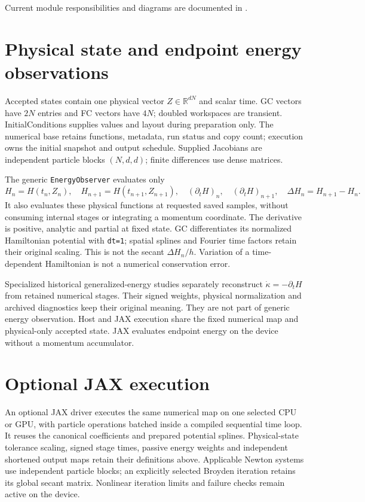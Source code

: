 \documentclass[11pt,a4paper]{article}
\begin{document}
Current module responsibilities and diagrams are documented in
.

\section{Physical state and endpoint energy observations}
Accepted states contain one physical vector $Z\in\mathbb{R}^{dN}$ and scalar time.
GC vectors have $2N$ entries and FC vectors have $4N$; doubled workspaces are
transient. InitialConditions supplies values and layout during preparation only.
The numerical base retains functions, metadata, run status and copy count;
execution owns the initial snapshot and output schedule. Supplied Jacobians are
independent particle blocks $(N,d,d)$; finite differences use dense matrices.

The generic \texttt{EnergyObserver} evaluates only
\[
 H_n=H(t_n,Z_n),\quad H_{n+1}=H(t_{n+1},Z_{n+1}),\quad
 (\partial_tH)_n,\quad (\partial_tH)_{n+1},\quad
 \Delta H_n=H_{n+1}-H_n.
\]
It also evaluates these physical functions at requested saved samples, without
consuming internal stages or integrating a momentum coordinate. The derivative
is positive, analytic and partial at fixed state. GC differentiates its normalized
Hamiltonian potential with \texttt{dt=1}; spatial splines and Fourier time factors
retain their original scaling. This is not the secant $\Delta H_n/h$.
Variation of a time-dependent Hamiltonian is not a numerical conservation error.

Specialized historical generalized-energy studies separately reconstruct
$\dot\kappa=-\partial_tH$ from retained numerical stages. Their signed weights,
physical normalization and archived diagnostics keep their original meaning.
They are not part of generic energy observation. Host and JAX execution share
the fixed numerical map and physical-only accepted state. JAX evaluates endpoint
energy on the device without a momentum accumulator.

\section{Optional JAX execution}

An optional JAX driver executes the same numerical map on one selected CPU
or GPU, with particle operations batched inside a compiled sequential time
loop. It reuses the canonical coefficients and prepared potential splines.
Physical-state tolerance scaling, signed stage times, passive energy weights
and independent shortened output maps retain their definitions above.
Applicable Newton systems use independent particle blocks; an explicitly
selected Broyden iteration retains its global secant matrix. Nonlinear
iteration limits and failure checks remain active on the device.
\end{document}
